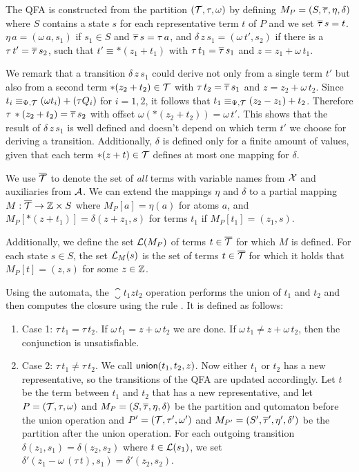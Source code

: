 The QFA is constructed from the partition  $(\mathcal{T}, \tau, \omega)$ by defining $M_P = (S, \overline{\tau}, \eta, \delta)$ where $S$ contains a state $s$ for each representative term $t$ of $P$ and we set $\overline{\tau}\,s = t$.
$\eta\,a = (\omega\,a, s_1)$ if $s_1 \in S$ and $\overline{\tau}\,s = \tau\,a$,
and $\delta\,z\,s_1 = (\omega\,t', s_2)$ if there is a $\tau\,t'=\overline{\tau}\,s_2$, such that $t' \equiv *(z_1 + t_1)$ with $\tau \,t_1= \overline{\tau}\,s_1$ and $z = z_1 + \omega\,t_1$.

We remark that a transition $\delta\,z\,s_1$ could derive not only from a single term $t'$ but also from a second term $*(z_2 + t_2) \in \mathcal{T}$ with $\tau\,t_2=\overline{\tau}\,s_1$ and $z = z_2 + \omega\,t_2$.
Since $t_i \equiv_{\Psi,\mathcal{T}} (\omega t_i) + (\tau Q_i)$ for $i = 1,2$, it follows that $t_1 \equiv_{\Psi,\mathcal{T}} (z_2 - z_1)+ t_2$.
Therefore $\tau\,*(z_2+t_2)=\overline{\tau}\,s_2$ with offset $\omega(*(z_2+t_2)) = \omega\,t'$.
This shows that the result of $\delta\,z\,s_1$ is well defined and doesn't depend on which term $t'$ we choose for deriving a transition.
Additionally, $\delta$ is defined only for a finite amount of values, given that each term $*(z + t) \in \mathcal{T}$ defines at most one mapping for $\delta$.

We use ${\overline{\mathcal{T}}}$ to denote the set of \emph{all} terms with variable names from $\mathcal{X}$ and auxiliaries from $\mathcal{A}$.
We can extend the mappings $\eta$ and $\delta$ to a partial mapping $M : {\overline{\mathcal{T}}} \rightarrow \mathbb{Z} \times S$ where $M_P[a] = \eta(a)$ for atoms $a$, and $M_P[*(z+t_1)] = \delta(z+z_1, s)$ for terms $t_1$ if $M_P[t_1] = (z_1,s)$.

Additionally, we define the set $\mathcal{L}(M_P)$ of terms $t \in {\overline{\mathcal{T}}}$ for which $M$ is defined.
For each state $s \in S$, the set $\mathcal{L}_M(s)$ is the set of terms $t \in {\overline{\mathcal{T}}}$ for which it holds that $M_P[t] = (z, s)$ for some $z \in \mathbb{Z}$.

Using the automata, the $\closure{t_1}{z}{t_2}$  operation performs the union of $t_1$ and $t_2$ and
then computes the closure using the rule .
It is defined as follows:

\begin{enumerate}
  \item Case 1: $\tau\,t_1 = \tau\,t_2$. If $\omega\,t_1 = z + \omega\,t_2$ we are done.
  If $\omega\,t_1 \neq z + \omega\,t_2$, then the conjunction is unsatisfiable.
  \item Case 2: $\tau\,t_1 \neq \tau\,t_2$. We call $\textsf{union}(t_1, t_2, z)$.
  Now either $t_1$ or $t_2$ has a new representative, so the transitions of the QFA are updated accordingly.
  Let $t$ be the term between $t_1$ and $t_2$ that has a new representative,
  and let $P = (\mathcal{T}, \tau, \omega)$ and $M_P = (S, \overline{\tau}, \eta, \delta)$ be the partition and qutomaton before the union operation
  and $P' = (\mathcal{T}, \tau', \omega')$ and $M_{P'} = (S', \overline{\tau}', \eta', \delta')$ be the partition after the union operation.
  For each outgoing transition $\delta(z_1, s_1) = \delta(z_2, s_2)$ where $t \in \mathcal{L}(s_1)$,
  we set $\delta'(z_1 - \omega\,(\tau\,t), s_1) = \delta'(z_2, s_2)$.
\end{enumerate}

